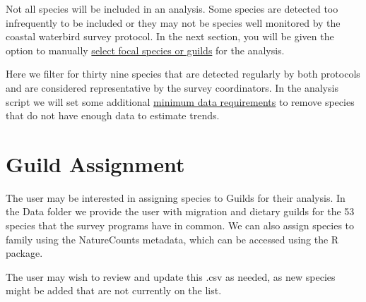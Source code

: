 \documentclass[
  letterpaper,
  DIV=11,
  numbers=noendperiod]{scrreprt}
\newenvironment{Shaded}{\begin{snugshade}}{\end{snugshade}}
\newcommand{\AttributeTok}[1]{\textcolor[rgb]{0.40,0.45,0.13}{#1}}
\newcommand{\CommentTok}[1]{\textcolor[rgb]{0.37,0.37,0.37}{#1}}
\newcommand{\ConstantTok}[1]{\textcolor[rgb]{0.56,0.35,0.01}{#1}}
\newcommand{\FunctionTok}[1]{\textcolor[rgb]{0.28,0.35,0.67}{#1}}
\newcommand{\NormalTok}[1]{\textcolor[rgb]{0.00,0.23,0.31}{#1}}
\newcommand{\OtherTok}[1]{\textcolor[rgb]{0.00,0.23,0.31}{#1}}
\newcommand{\SpecialCharTok}[1]{\textcolor[rgb]{0.37,0.37,0.37}{#1}}
\newcommand{\StringTok}[1]{\textcolor[rgb]{0.13,0.47,0.30}{#1}}
\begin{document}
Not all species will be included in an analysis. Some species are
detected too infrequently to be included or they may not be species well
monitored by the coastal waterbird survey protocol. In the next section,
you will be given the option to manually \hyperref[3.1.2Analysis]{select
focal species or guilds} for the analysis.

Here we filter for thirty nine species that are detected regularly by
both protocols and are considered representative by the survey
coordinators. In the analysis script we will set some additional
\hyperref[3.1.3Analysis]{minimum data requirements} to remove species
that do not have enough data to estimate trends.

\begin{Shaded}
\end{Shaded}

\section{Guild Assignment}\label{2.5Data}

The user may be interested in assigning species to Guilds for their
analysis. In the Data folder we provide the user with migration and
dietary guilds for the 53 species that the survey programs have in
common. We can also assign species to family using the NatureCounts
metadata, which can be accessed using the R package.

The user may wish to review and update this .csv as needed, as new
species might be added that are not currently on the list.
\end{document}
